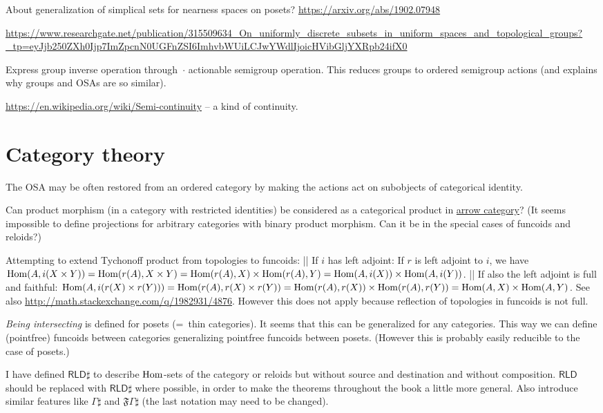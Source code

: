 \documentclass{amsart}
\begin{document}
About generalization of simplical sets for nearness spaces on posets?
\url{https://arxiv.org/abs/1902.07948}

\url{https://www.researchgate.net/publication/315509634_On_uniformly_discrete_subsets_in_uniform_spaces_and_topological_groups?_tp=eyJjb250ZXh0Ijp7ImZpcnN0UGFnZSI6ImhvbWUiLCJwYWdlIjoicHVibGljYXRpb24ifX0}

Express group inverse operation through~$\cdot$ actionable semigroup operation.
This reduces groups to ordered semigroup actions (and explains why groups and OSAs are so similar).

\url{https://en.wikipedia.org/wiki/Semi-continuity} -- a kind of continuity.

\section{Category theory}

The OSA may be often restored from an ordered category
by making the actions act on subobjects of categorical identity.

Can product morphism (in a category with restricted
identities) be considered as a categorical product
in \href{https://en.wikipedia.org/wiki/Comma_category#Arrow_category}{arrow category}?
(It seems impossible to define projections for
arbitrary categories with binary product morphism.
Can it be in the special cases of funcoids and reloids?)

Attempting to extend Tychonoff product from topologies to funcoids:
|| If $i$ has left adjoint:
If $r$ is left adjoint to $i$, we have $\operatorname{Hom}(A, i(X\times Y)) = \operatorname{Hom}(r(A), X\times Y) = \operatorname{Hom}(r(A), X)\times \operatorname{Hom}(r(A), Y) = \operatorname{Hom}(A, i(X))\times \operatorname{Hom}(A, i(Y))$.
|| If also the left adjoint is full and faithful:
$\operatorname{Hom}(A, i(r(X)\times r(Y))) = \operatorname{Hom}(r(A), r(X)\times r(Y)) = \operatorname{Hom}(r(A), r(X))\times \operatorname{Hom}(r(A), r(Y)) = \operatorname{Hom}(A, X)\times \operatorname{Hom}(A, Y)$.
See also \url{http://math.stackexchange.com/q/1982931/4876}. However this does not apply because reflection of topologies in funcoids
is not full.

\emph{Being intersecting} is defined for posets (=~thin categories). It seems that this can be generalized for any categories.
This way we can define (pointfree) funcoids between categories generalizing pointfree funcoids between posets.
(However this is probably easily reducible to the case of posets.)

I have defined $\mathsf{RLD}\sharp$ to describe $\operatorname{Hom}$-sets of the category or reloids but without source and destination and without composition.
$\mathsf{RLD}$ should be replaced with $\mathsf{RLD}\sharp$ where possible, in order to make the theorems throughout the book a little more general.
Also introduce similar features like $\Gamma\sharp$ and $\mathfrak{F}\Gamma\sharp$ (the last notation may need to be changed).
\end{document}
